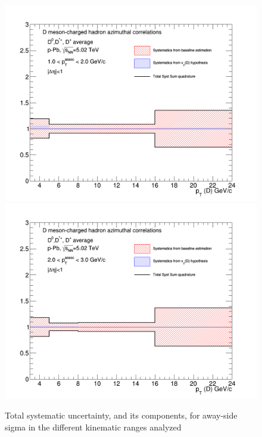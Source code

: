 \begin{figure}[!htbp]
{\includegraphics[width=0.49\linewidth, height=0.33\linewidth]{figures/FitOutput/TotalSystematicSourcesASSigma_pthad1dotto2dot.png}}
{\includegraphics[width=0.49\linewidth, height=0.33\linewidth]{figures/FitOutput/TotalSystematicSourcesASSigma_pthad2dotto3dot.png}}
\caption{Total systematic uncertainty, and its components, for away-side sigma in the different kinematic ranges analyzed}
\label{fig:ASsigmaTotalUnc}
\end{figure}


